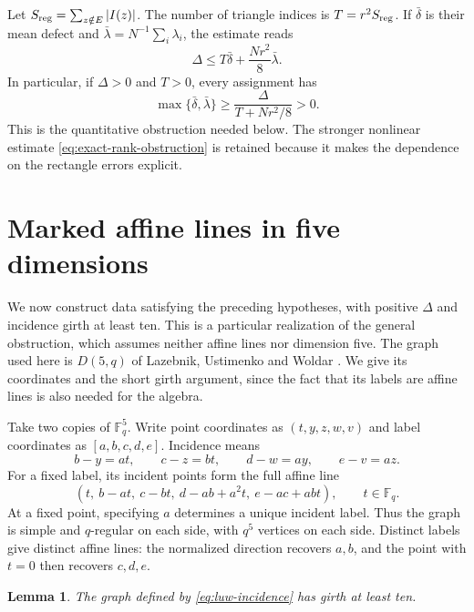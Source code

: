 \documentclass[11pt]{amsart}
\newtheorem{lemma}[theorem]{Lemma}
\theoremstyle{definition}
\theoremstyle{remark}
\numberwithin{equation}{section}
\newcommand{\F}{\mathbb F}
\begin{document}
Let $S_{\rm reg}=\sum_{z\notin E}|I(z)|$. The number of triangle
indices is $T=r^2S_{\rm reg}$. If $\bar\delta$ is their mean defect
and $\bar\lambda=N^{-1}\sum_i\lambda_i$, the estimate reads
\begin{equation}\label{eq:average}
 \Delta\le T\bar\delta+\frac{Nr^2}{8}\bar\lambda.
\end{equation}
In particular, if $\Delta>0$ and $T>0$, every assignment has
\[
 \max\{\bar\delta,\bar\lambda\}
 \ge\frac{\Delta}{T+Nr^2/8}>0.
\]
This is the quantitative obstruction needed below. The stronger
nonlinear estimate \eqref{eq:exact-rank-obstruction} is retained
because it makes the dependence on the rectangle errors explicit.

\section{Marked affine lines in five dimensions}\label{sec:incidence}

We now construct data satisfying the preceding hypotheses, with
positive $\Delta$ and incidence girth at least ten. This is a
particular realization of the general obstruction, which assumes
neither affine lines nor dimension five. The graph used
here is $D(5,q)$ of Lazebnik, Ustimenko and Woldar
\cite[Section~2, Proposition~2.1]{LUW}. We give its coordinates and
the short girth argument, since the fact that its labels are affine
lines is also needed for the algebra.

Take two copies of $\F_q^5$. Write point coordinates as
$(t,y,z,w,v)$ and label coordinates as $[a,b,c,d,e]$. Incidence means
\begin{equation}\label{eq:luw-incidence}
 b-y=at,\qquad c-z=bt,\qquad d-w=ay,\qquad e-v=az.
\end{equation}
For a fixed label, its incident points form the full affine line
\begin{equation}\label{eq:luw-line}
 (t,\ b-at,\ c-bt,\ d-ab+a^2t,\ e-ac+abt),
 \qquad t\in\F_q.
\end{equation}
At a fixed point, specifying $a$ determines a unique incident label.
Thus the graph is simple and $q$-regular on each side, with $q^5$
vertices on each side. Distinct labels give distinct affine lines:
the normalized direction recovers $a,b$, and the point with $t=0$
then recovers $c,d,e$.

\begin{lemma}\label{lem:girth}
The graph defined by \eqref{eq:luw-incidence} has girth at least ten.
\end{lemma}
\end{document}
